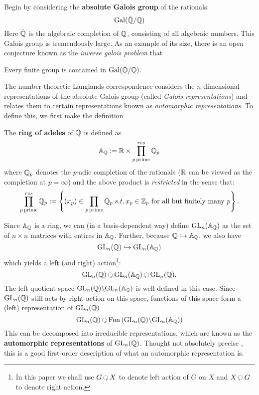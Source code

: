 Begin by considering the \textbf{absolute Galois group} of the rationals:
\[
	\mathrm{Gal}(\bar {\mathbb{Q}}/\mathbb{Q})
\]
Here $\bar {\mathbb{Q}}$ is the algebraic completion of $\mathbb{Q}$, consisting of all algebraic numbers. This Galois group is tremendously large. As an example of its size, there is an open conjecture known as the \emph{inverse galois problem} that 
\begin{conj}
	Every finite group is contained in $\mathrm{Gal}(\bar {\mathbb{Q}}/\mathbb{Q})$.
\end{conj}
The number theoretic Langlands correspondence considers the $n$-dimensional representations of the absolute Galois group (called \emph{Galois representations}) and relates them to certain representations known as \emph{automorphic representations}. To define this, we first make the definition
\begin{defn}
	The \textbf{ring of adeles} of $\mathbb{Q}$ is defined as 
	\[
		\mathbb A_{\mathbb{Q}} := \mathbb{R} \times \prod_{p\, \mathrm{prime}}^{res} \mathbb{Q}_p
	\]
	where $\mathbb{Q}_p$ denotes the $p$-adic completion of the rationals \cite{bachman1964} ($\mathbb{R}$ can be viewed as the completion at $p=\infty$) and the above product is \emph{restricted} in the sense that:
	\[
		\prod_{p\, \mathrm{prime}}^{res} \mathbb{Q}_p := \left\{ (x_p) \in \prod_{p\, \mathrm{prime}} \mathbb{Q}_p \; s.t. \, x_p \in \mathbb Z_p \text{ for all but finitely many } p\right\}.
	\]
\end{defn}

Since $\mathbb A_{\mathbb{Q}}$ is a ring, we can (in a basis-dependent way) define $\mathrm{GL}_n(\mathbb A_{\mathbb{Q}})$ as the set of $n \times n$ matrices with entires in $\mathbb A_{\mathbb{Q}}$. Further, because $\mathbb{Q} \hookrightarrow \mathbb A_{\mathbb{Q}}$, we also have 
\[
	\mathrm{GL}_n(\mathbb{Q}) \hookrightarrow \mathrm{GL}_n(\mathbb A_{\mathbb{Q}})
\]
which yields a left (and right) action\footnote{In this paper we shall use $G\lacts X$ to denote left action of $G$ on $X$ and $X \racts G$ to denote right action.}:
\[
	\GL_n(\qq) \lacts  \GL_n(\mathbb A_\qq) \racts  \GL_n(\qq).
\]
The left quotient space $\mathrm{GL}_n(\mathbb{Q}) \backslash \mathrm{GL}_n(\mathbb A_{\mathbb{Q}})$ is well-defined in this case. Since $\mathrm{GL}_n(\mathbb{Q})$ still acts by right action on this space, functions of this space form a (left) representation of $\mathrm{GL}_n(\mathbb{Q})$
\[
	\GL_n(\qq) \lacts \mathrm{Fun}\left( \GL_n(\qq) \backslash \GL_n(\mathbb A_\qq) \right)
\]
This can be decomposed into irreducible representations, which are known as the \textbf{automorphic representations} of $\mathrm{GL}_n(\mathbb{Q})$.
Thought not absolutely precise \cite{Yoo18}, this is a good first-order description of what an automorphic representation is. 

